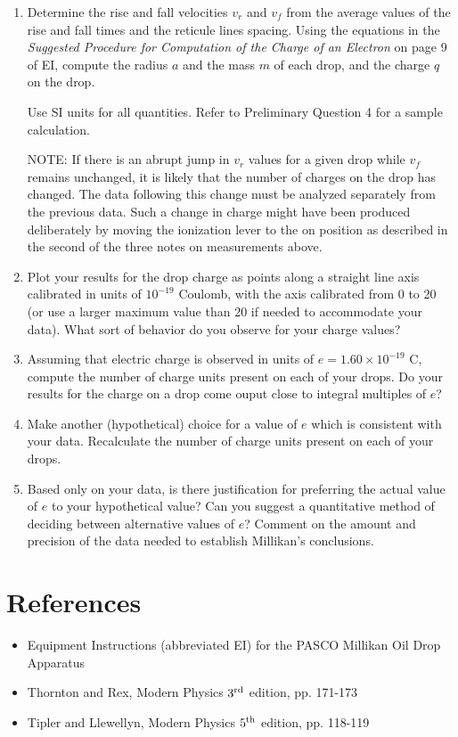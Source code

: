 \begin{enumerate}
\item Determine the rise and fall velocities
$v_r$ and $v_f$ from the average values of the
rise and fall times and the reticule lines spacing. Using the equations
in the {\em Suggested Procedure for Computation of
the Charge of an Electron} on page 9 of EI,
compute the radius $a$ and the mass $m$ of each drop, and the charge $q$ on
the drop.

Use SI units for all quantities.  Refer to Preliminary Question 4 for a
sample calculation.

NOTE: If there is an abrupt jump in
$v_r$ values for a given drop while
$v_f$ remains unchanged, it is likely
that the number of charges on the drop has changed.  The data
following this change must be analyzed separately from the previous
data.  Such a change in charge might have been produced deliberately
by moving the ionization lever to the on position as described in the
second of the three notes on measurements above.

\item Plot your results for the drop charge as points along a
straight line axis calibrated in units of
$10^{-19}$ Coulomb, with the axis
calibrated from 0 to 20 (or use a larger maximum value than 20 if
needed to accommodate your data).  What sort of behavior do you
observe for your charge values?

\item Assuming that electric charge is observed in units of $e =
1.60 \times 10^{-19}$ C, compute the
number of charge units present on each of your drops.  Do your results
for the charge on a drop come ouput close to integral multiples of $e$?

\item Make another (hypothetical) choice for a value of $e$ which is
consistent with your data.  Recalculate the number of charge units
present on each of your drops.

\item Based only on your data, is there justification for preferring the
actual value of $e$ to your hypothetical value?  Can you suggest a quantitative method of deciding
between alternative values of $e$?  Comment on the amount and precision
of the data needed to establish Millikan's
conclusions.
\end{enumerate}

\section{References}

\begin{itemize}
\item Equipment Instructions (abbreviated EI) for the PASCO Millikan Oil Drop Apparatus
\item Thornton and Rex, Modern Physics $3^{\rm rd}$ edition, pp. 171-173
\item Tipler and Llewellyn, Modern Physics $5^{\rm th}$ edition, pp. 118-119
\end{itemize}

